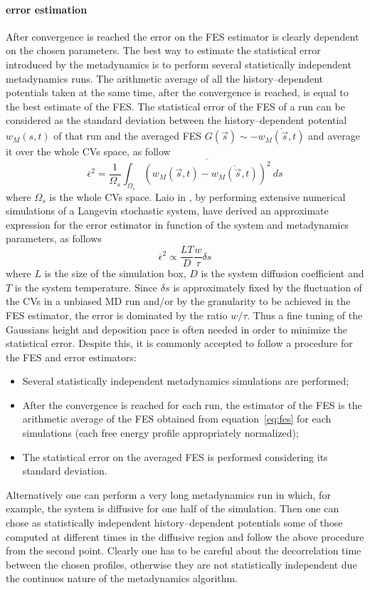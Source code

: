 \paragraph{\textbf{error estimation}} After convergence is reached the error on the \ac{FES} estimator is clearly
dependent on the chosen parameters. The best way to estimate the statistical error introduced by the metadynamics
is to perform several statistically independent metadynamics runs. The arithmetic average of all the
history--dependent potentials taken at the same time, after the convergence is reached, is equal to the best
estimate of the \ac{FES}. The statistical error of the \ac{FES} of a run can be considered as the standard
deviation between the history--dependent potential $w_M(s,t)$ of that run and the averaged \ac{FES}
$G(\vec s) \sim - \overline{w_M(\vec s,t)}$ and average it over the whole \acp{CV} space, as follow
\begin{equation*}
	\overline{\epsilon}^2 = \frac{1}{\Omega_s} \int_{\Omega_s}  \overline{(w_M(\vec s,t) - \overline{w_M(\vec s,t)})^2}\ ds%
\end{equation*}
where $\Omega_s$ is the whole \acp{CV} space. Laio \etal in \cite{MetadError}, by performing extensive
numerical simulations of a Langevin stochastic system, have derived an approximate expression for the error
estimator in function of the system and metadynamics parameters, as follows
\begin{equation*}
	\overline{\epsilon}^2 \propto \frac{LT}{D}\frac{w}{\tau} \delta s
\end{equation*}
where $L$ is the size of the simulation box, $D$ is the system diffusion coefficient and $T$ is the system
temperature. Since $\delta s$ is approximately fixed by the fluctuation of the \acp{CV} in a unbiased \ac{MD} run
and/or by the granularity to be achieved in the \ac{FES} estimator, the error is dominated by the ratio $w/\tau$.
Thus a fine tuning of the Gaussians height and deposition pace is often needed in order to minimize the
statistical error. Despite this, it is commonly accepted to follow a procedure for the \ac{FES} and error
estimators:
\begin{itemize}
	\item Several statistically independent metadynamics simulations are performed;
	\item After the convergence is reached for each run, the estimator of the \ac{FES} is the arithmetic average of the \ac{FES} obtained from equation~\eqref{eq:fes} for each simulations (each free energy profile appropriately normalized);%
	\item The statistical error on the averaged \ac{FES} is performed considering its standard deviation.
\end{itemize}
Alternatively one can perform a very long metadynamics run in which, for example, the system is diffusive for one
half of the simulation. Then one can chose as statistically independent history--dependent potentials some of those
computed at different times in the diffusive region and follow the above procedure from the second point. Clearly
one has to be careful about the decorrelation time between the chosen profiles, otherwise they are not
statistically independent due the continuos nature of the metadynamics algorithm.

